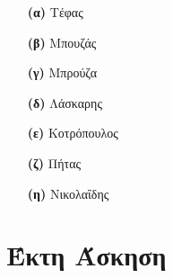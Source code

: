\documentclass{article}
\begin{document}
\begin{itemize}
\item[\textbf{(α)}] Τέφας
\item[\textbf{(β)}] Μπουζάς
\item[\textbf{(γ)}] Μπρούζα
\item[\textbf{(δ)}] Λάσκαρης
\item[\textbf{(ε)}] Κοτρόπουλος
\item[\textbf{(ζ)}] Πήτας
\item[\textbf{(η)}] Νικολαΐδης
\end{itemize}

\section{Έκτη Άσκηση}

\end{document}

